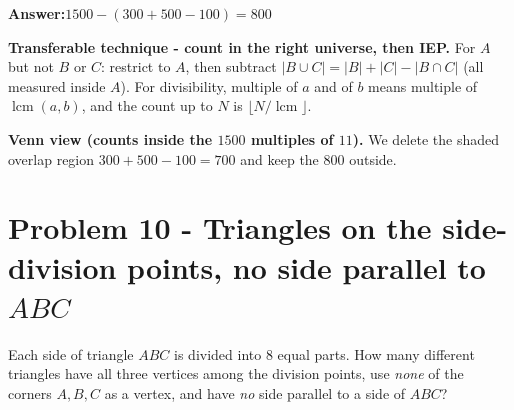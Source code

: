 \documentclass[11pt,a4paper]{article}
\newcommand{\answer}[1]{\begin{answerbox}\centering\textbf{Answer:}\quad #1\end{answerbox}}
\begin{document}
\answer{$1500-(300+500-100)=800$}

\begin{methodbox}
\textbf{Transferable technique - count in the right universe, then IEP.} For
\textquotedbl{}$A$ but not $B$ or $C$\textquotedbl{}: restrict to $A$, then subtract
$|B\cup C|=|B|+|C|-|B\cap C|$ (all measured inside $A$). For divisibility, \textquotedbl{}multiple
of $a$ and of $b$\textquotedbl{} means \textquotedbl{}multiple of $\operatorname{lcm}(a,b)$\textquotedbl{}, and
the count up to $N$ is $\lfloor N/\operatorname{lcm}\rfloor$.
\end{methodbox}

\medskip
\textbf{Venn view (counts inside the $1500$ multiples of $11$).} We delete the shaded overlap region
$300+500-100=700$ and keep the $800$ outside.

\begin{center}
\end{center}

\section*{Problem 10 - Triangles on the side-division points, no side parallel to $ABC$}

\begin{problembox}[10]
Each side of triangle $ABC$ is divided into $8$ equal parts. How many different triangles have all
three vertices among the division points, use \emph{none} of the corners $A,B,C$ as a vertex, and
have \emph{no} side parallel to a side of $ABC$?
\end{problembox}
\end{document}
